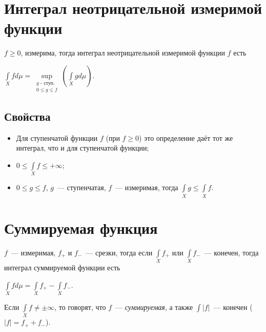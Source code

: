 \documentclass{article}
\begin{document}
    \newpage
    
    \section{Интеграл неотрицательной измеримой функции}
    
        $f \geqslant 0$, измерима, тогда интеграл неотрицательной измеримой функции $f$ есть
        
        $\int\limits_{X} f d \mu = \sup\limits_{\substack{\text{$g$ - ступ.} \\ 0 \leqslant g \leqslant f}} \left( \int\limits_{X} g d \mu \right)$.
            
        \subsection{Свойства}
                
            \begin{itemize}
                
                \item Для ступенчатой функции $f$ (при $f \geqslant 0$) это определение даёт тот же интеграл, что и для ступенчатой функции;
                    
                \item $0 \leqslant \int\limits_{X} f \leqslant +\infty$;
                    
                \item $0 \leqslant g \leqslant f$, $g$~--- ступенчатая, $f$~--- измеримая, тогда $\int\limits_{X} g \leqslant \int\limits_{X} f$.
                    
            \end{itemize}
                
    \newpage
    
    \section{Суммируемая функция}
    
        $f$~--- измеримая, $f_+$ и $f_-$~--- срезки, тогда если $\int\limits_{X} f_+$ или $\int\limits_{X} f_-$~--- конечен, тогда интеграл суммируемой функции есть
            
        $\int\limits_{X} f d \mu = \int\limits_{X} f_+ - \int\limits_{X} f_-$. 
                
        Если $\int\limits_{X} f \neq \pm \infty$, то говорят, что $f$~--- \textit{суммируемая}, а также $\int |f|$~--- конечен ($|f| = f_+ + f_-$).
                
\end{document}
